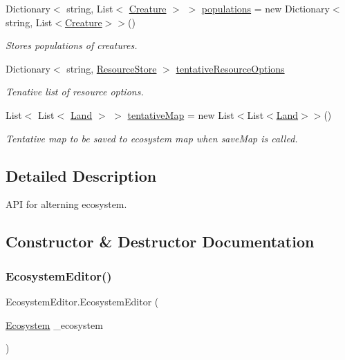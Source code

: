 \begin{DoxyCompactItemize}
Dictionary$<$ string, List$<$ \mbox{\hyperlink{class_creature}{Creature}} $>$ $>$ \mbox{\hyperlink{class_ecosystem_editor_abea7f35b0d4980aad82dac92b6011993}{populations}} = new Dictionary$<$string, List$<$\mbox{\hyperlink{class_creature}{Creature}}$>$$>$()
\begin{DoxyCompactList}\small\item\em Stores populations of creatures. \end{DoxyCompactList}\item 
Dictionary$<$ string, \mbox{\hyperlink{class_resource_store}{Resource\+Store}} $>$ \mbox{\hyperlink{class_ecosystem_editor_aa0e6ad8b42512f087178aca21464da02}{tentative\+Resource\+Options}}
\begin{DoxyCompactList}\small\item\em Tenative list of resource options. \end{DoxyCompactList}\item 
List$<$ List$<$ \mbox{\hyperlink{class_land}{Land}} $>$ $>$ \mbox{\hyperlink{class_ecosystem_editor_a40077803f584d6c42951feac3569a972}{tentative\+Map}} = new List$<$List$<$\mbox{\hyperlink{class_land}{Land}}$>$$>$()
\begin{DoxyCompactList}\small\item\em Tentative map to be saved to ecosystem map when save\+Map is called. \end{DoxyCompactList}\end{DoxyCompactItemize}


\subsection{Detailed Description}
A\+PI for alterning ecosystem. 



\subsection{Constructor \& Destructor Documentation}
\mbox{\label{class_ecosystem_editor_ae398c2a58464b4f994929f22c71c36cc}} 
\subsubsection{\texorpdfstring{Ecosystem\+Editor()}{EcosystemEditor()}}
{\footnotesize\ttfamily Ecosystem\+Editor.\+Ecosystem\+Editor (\begin{DoxyParamCaption}\item[{\mbox{\hyperlink{class_ecosystem}{Ecosystem}}}]{\+\_\+ecosystem }\end{DoxyParamCaption})}



